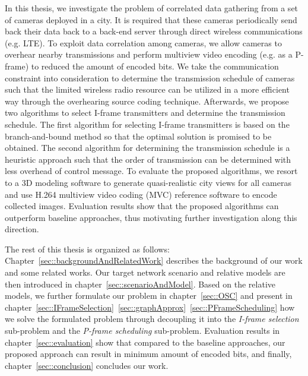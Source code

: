 In this thesis, we investigate the problem of correlated data gathering from a set of cameras deployed in a city.
It is required that these cameras periodically send back their data back to a back-end server through direct wireless communications (e.g. LTE).
To exploit data correlation among cameras, we allow cameras to overhear nearby transmissions and perform multiview video encoding (e.g. as a P-frame) to reduced the amount of encoded bits.
We take the communication constraint into consideration to determine the transmission schedule of cameras such that the limited wireless radio resource can be utilized in a more efficient way through the overhearing source coding technique.
Afterwards, we propose two algorithms to select I-frame transmitters and determine the transmission schedule.
The first algorithm for selecting I-frame transmitters is based on the branch-and-bound method so that the optimal solution is promised to be obtained.
The second algorithm for determining the transmission schedule is a heuristic approach such that the order of transmission can be determined with less overhead of control message.
To evaluate the proposed algorithms, we resort to a 3D modeling software to generate quasi-realistic city views for all cameras and use H.264 multiview video coding (MVC) reference software to encode collected images.
Evaluation results show that the proposed algorithms can outperform baseline approaches, thus motivating further investigation along this direction.

The rest of this thesis is organized as follows:
Chapter~\ref{sec::backgroundAndRelatedWork} describes the background of our work and some related works.
Our target network scenario and relative models are then introduced in chapter~\ref{sec::scenarioAndModel}.
Based on the relative models, we further formulate our problem in chapter~\ref{sec::OSC} and present in chapter~\ref{sec::IFrameSelection}~\ref{sec::graphApprox}~\ref{sec::PFrameScheduling} how we solve the formulated problem through decoupling it into the {\em I-frame selection} sub-problem and the {\em P-frame scheduling} sub-problem. 
Evaluation results in chapter~\ref{sec::evaluation} show that compared to the baseline approaches, our proposed approach can result in minimum amount of encoded bits, and finally, chapter~\ref{sec::conclusion} concludes our work.